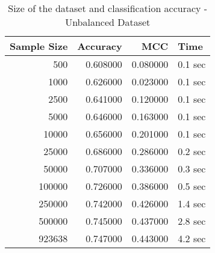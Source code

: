 \begin{table}
\caption{Size of the dataset and classification accuracy - Unbalanced Dataset}
\label{tab:unbal_size}
\begin{tabular}{rrrl}
\toprule
Sample Size & Accuracy & MCC & Time \\
\midrule
500 & 0.608000 & 0.080000 & 0.1 sec \\
1000 & 0.626000 & 0.023000 & 0.1 sec \\
2500 & 0.641000 & 0.120000 & 0.1 sec \\
5000 & 0.646000 & 0.163000 & 0.1 sec \\
10000 & 0.656000 & 0.201000 & 0.1 sec \\
25000 & 0.686000 & 0.286000 & 0.2 sec \\
50000 & 0.707000 & 0.336000 & 0.3 sec \\
100000 & 0.726000 & 0.386000 & 0.5 sec \\
250000 & 0.742000 & 0.426000 & 1.4 sec \\
500000 & 0.745000 & 0.437000 & 2.8 sec \\
923638 & 0.747000 & 0.443000 & 4.2 sec \\
\bottomrule
\end{tabular}
\end{table}
